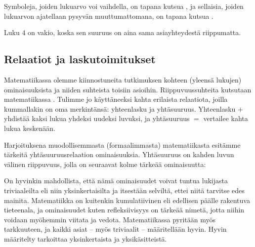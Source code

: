 Symboleja, joiden lukuarvo voi vaihdella, on tapana kutsua , ja sellaisia, joiden lukuarvon ajatellaan pysyvän muuttumattomana, on tapana kutsua .

\begin{esimerkki}
Luku $4$ on vakio, koska sen suuruus on aina sama asiayhteydestä riippumatta.
\end{esimerkki}


\subsection{Relaatiot ja laskutoimitukset}

Matematiikassa olemme kiinnostuneita tutkimuksen kohteen (yleensä lukujen) ominaisuuksista ja niiden suhteista toisiin asioihin. Riippuvuussuhteita kutsutaan matematiikassa . Tulimme jo käyttäneeksi kahta erilaista relaatiota, joilla kummallakin on oma merkintänsä: yhteenlasku ja yhtäsuuruus. Yhteenlasku $+$ yhdistää kaksi lukua yhdeksi uudeksi luvuksi, ja yhtäsuuruus $=$ vertailee kahta lukua keskenään.

Harjoituksena muodollisemmasta (formaalimmasta) matematiikasta esitämme tärkeitä yhtäsuuruusrelaation ominaisuuksia. Yhtäsuuruus on kahden luvun välinen riippuvuus, jolla on seuraavat kolme tärkeää ominaisuutta:


\begin{esimerkki}
\end{esimerkki}

On hyvinkin mahdollista, että nämä ominaisuudet voivat tuntua lukijasta triviaaleilta eli niin yksinkertaisilta ja itsestään selviltä, ettei niitä tarvitse edes mainita. Matematiikka on kuitenkin kumulatiivinen eli edellisen päälle rakentuva tieteenala, ja ominaisuudet kuten refleksiivisyys on tärkeää nimetä, jotta niihin voidaan myöhemmin viitata ja vedota. Matematiikassa pyritään myös tarkkuuteen, ja kaikki asiat -- myös triviaalit -- määritellään hyvin. Hyvin määritelty tarkoittaa yksinkertaista ja yksikäsitteistä.

